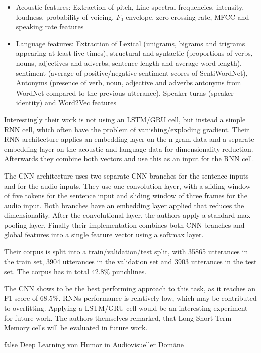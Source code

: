 \documentclass[draft,final,oneside]{vutinfth} %
\begin{document}
\begin{itemize}
\item Acoustic features: Extraction of pitch, Line spectral frequencies, intensity, loudness, probability of voicing, $F_0$ envelope, zero-crossing rate, MFCC and speaking rate features
\item Language features: Extraction of Lexical (unigrams, bigrams and trigrams appearing at least five times), structural and syntactic (proportions of verbs, nouns, adjectives and adverbs, sentence length and average word length), sentiment (average of positive/negative sentiment scores of SentiWordNet), Antonyms (presence of verb, noun, adjective and adverbs antonyms from WordNet compared to the previous utterance), Speaker turns (speaker identity) and Word2Vec features
\end{itemize}

Interestingly their work is not using an LSTM/GRU cell, but instead a simple RNN cell, which often have the problem of vanishing/exploding gradient. \cite{hochreiter} Their RNN architecture applies an embedding layer on the n-gram data and a separate embedding layer on the acoustic and language data for dimensionality reduction. Afterwards they combine both vectors and use this as an input for the RNN cell.

The CNN architecture uses two separate CNN branches for the sentence inputs and for the audio inputs. They use one convolution layer, with a sliding window of five tokens for the sentence input and sliding window of three frames for the audio input. Both branches have an embedding layer applied that reduces the dimensionality. After the convolutional layer, the authors apply a standard max pooling layer. Finally their implementation combines both CNN branches and global features into a single feature vector using a softmax layer.

Their corpus is split into a train/validation/test split, with 35865 utterances in the train set, 3904 utterances in the validation set and 3903 utterances in the test set. The corpus has in total 42.8\% punchlines.

The CNN shows to be the best performing approach to this task, as it reaches an F1-score of 68.5\%. RNNs performance is relatively low, which may be contributed to overfitting. Applying a LSTM/GRU cell would be an interesting experiment for future work. The authors themselves remarked, that Long Short-Term Memory cells will be evaluated in future work.

\if false
Deep Learning von Humor in Audiovisueller Domäne
\end{document}
